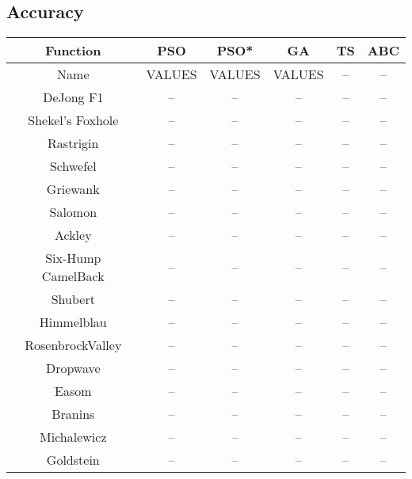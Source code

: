 \subsection{Accuracy}
\begin{center}
	\begin{tabular}{| c | c | c | c | c | c |}
	\hline
	Function & PSO & PSO* & GA & TS & ABC\\  \hline
	Name & VALUES & VALUES & VALUES\cite{} & -- & --\\ \hline
	DeJong F1 & -- & -- & -- & -- & --\\ \hline
	Shekel's Foxhole & -- & -- & -- & -- & --\\ \hline
	Rastrigin & -- & -- & -- & -- & --\\ \hline
	Schwefel & -- & -- & -- & -- & --\\ \hline
	Griewank & -- & -- & -- & -- & --\\ \hline
	Salomon & -- & -- & -- & -- & --\\ \hline
	Ackley & -- & -- & -- & -- & --\\ \hline
	Six-Hump CamelBack & -- & -- & -- & -- & --\\ \hline
	Shubert & -- & -- & -- & -- & --\\ \hline
	Himmelblau & -- & -- & -- & -- & --\\ \hline
	RosenbrockValley & -- & -- & -- & -- & --\\ \hline
	Dropwave & -- & -- & -- & -- & --\\ \hline
	Easom & -- & -- & -- & -- & --\\ \hline
	Branins & -- & -- & -- & -- & --\\ \hline
	Michalewicz & -- & -- & -- & -- & --\\ \hline
	Goldstein & -- & -- & -- & -- & --\\ \hline
	\end{tabular}
\end{center}

